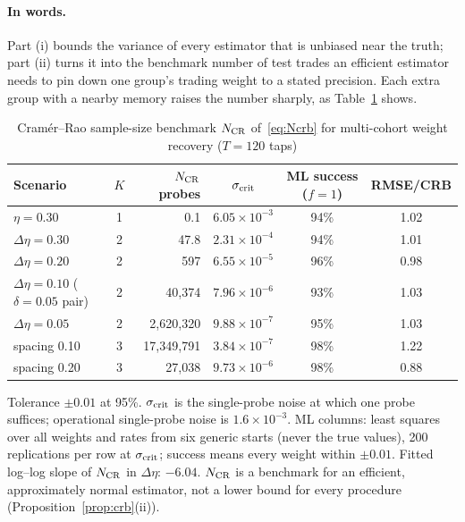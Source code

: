 \documentclass[12pt]{article}
\theoremstyle{definition}
\theoremstyle{remark}
\begin{document}
\paragraph{In words.} Part (i) bounds the variance of every estimator that is unbiased near the truth; part (ii) turns it into the benchmark number of test trades an efficient estimator needs to pin down one group's trading weight to a stated precision. Each extra group with a nearby memory raises the number sharply, as Table~\ref{tab:crb} shows.

\begin{table}[t]\centering\small
\begin{threeparttable}
\caption{Cram\'er--Rao sample-size benchmark $N_{\rm CR}$ of~\eqref{eq:Ncrb} for multi-cohort weight recovery ($T=120$ taps)}\label{tab:crb}
\begin{tabular}{lcrccc}
\toprule
Scenario & $K$ & $N_{\rm CR}$ probes & $\sigma_{\rm crit}$ & ML success ($f=1$) & RMSE/CRB\\
\midrule
$\eta=0.30$ & 1 & 0.1 & $6.05\times10^{-3}$ & 94\% & 1.02\\
$\Delta\eta=0.30$ & 2 & 47.8 & $2.31\times10^{-4}$ & 94\% & 1.01\\
$\Delta\eta=0.20$ & 2 & 597 & $6.55\times10^{-5}$ & 96\% & 0.98\\
$\Delta\eta=0.10$ ($\delta=0.05$ pair) & 2 & 40{,}374 & $7.96\times10^{-6}$ & 93\% & 1.03\\
$\Delta\eta=0.05$ & 2 & 2{,}620{,}320 & $9.88\times10^{-7}$ & 95\% & 1.03\\
spacing 0.10 & 3 & 17{,}349{,}791 & $3.84\times10^{-7}$ & 98\% & 1.22\\
spacing 0.20 & 3 & 27{,}038 & $9.73\times10^{-6}$ & 98\% & 0.88\\
\bottomrule
\end{tabular}
\begin{tablenotes}\footnotesize\item Tolerance $\pm0.01$ at 95\%. $\sigma_{\rm crit}$ is the single-probe noise at which one probe suffices; operational single-probe noise is $1.6\times10^{-3}$. ML columns: least squares over all weights and rates from six generic starts (never the true values), 200 replications per row at $\sigma_{\rm crit}$; success means every weight within $\pm0.01$. Fitted log--log slope of $N_{\rm CR}$ in $\Delta\eta$: $-6.04$. $N_{\rm CR}$ is a benchmark for an efficient, approximately normal estimator, not a lower bound for every procedure (Proposition~\ref{prop:crb}(ii)). \end{tablenotes}
\end{threeparttable}
\end{table}
\end{document}
